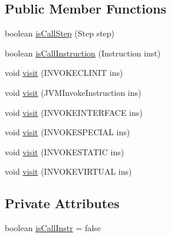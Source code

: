 \subsection*{Public Member Functions}
\begin{DoxyCompactItemize}
\item 
boolean \hyperlink{classgov_1_1nasa_1_1jpf_1_1inspector_1_1server_1_1pathanalysis_1_1_check_call_instruction_ad86391aaa5ef56fbf68af4fad31fcc7b}{is\+Call\+Step} (Step step)
\item 
boolean \hyperlink{classgov_1_1nasa_1_1jpf_1_1inspector_1_1server_1_1pathanalysis_1_1_check_call_instruction_aee2bf82b423eef6de81041c074340327}{is\+Call\+Instruction} (Instruction inst)
\item 
void \hyperlink{classgov_1_1nasa_1_1jpf_1_1inspector_1_1server_1_1pathanalysis_1_1_check_call_instruction_a9013497ed967aba3370f5b6ed14b155f}{visit} (I\+N\+V\+O\+K\+E\+C\+L\+I\+N\+IT ins)
\item 
void \hyperlink{classgov_1_1nasa_1_1jpf_1_1inspector_1_1server_1_1pathanalysis_1_1_check_call_instruction_af7eda93c3473fe1050332f3266f754f7}{visit} (J\+V\+M\+Invoke\+Instruction ins)
\item 
void \hyperlink{classgov_1_1nasa_1_1jpf_1_1inspector_1_1server_1_1pathanalysis_1_1_check_call_instruction_a8ee0595afd706bb2caa5452f3c4eeca9}{visit} (I\+N\+V\+O\+K\+E\+I\+N\+T\+E\+R\+F\+A\+CE ins)
\item 
void \hyperlink{classgov_1_1nasa_1_1jpf_1_1inspector_1_1server_1_1pathanalysis_1_1_check_call_instruction_ae4ee05f2e6617ddefbb088381c9125d7}{visit} (I\+N\+V\+O\+K\+E\+S\+P\+E\+C\+I\+AL ins)
\item 
void \hyperlink{classgov_1_1nasa_1_1jpf_1_1inspector_1_1server_1_1pathanalysis_1_1_check_call_instruction_a0c068d97695d2e16705cab2298caa442}{visit} (I\+N\+V\+O\+K\+E\+S\+T\+A\+T\+IC ins)
\item 
void \hyperlink{classgov_1_1nasa_1_1jpf_1_1inspector_1_1server_1_1pathanalysis_1_1_check_call_instruction_af5b10565e28fafc22a5d80b50621e780}{visit} (I\+N\+V\+O\+K\+E\+V\+I\+R\+T\+U\+AL ins)
\end{DoxyCompactItemize}
\subsection*{Private Attributes}
\begin{DoxyCompactItemize}
\item 
boolean \hyperlink{classgov_1_1nasa_1_1jpf_1_1inspector_1_1server_1_1pathanalysis_1_1_check_call_instruction_a925aecab303dc7fbf7a0011c10787764}{is\+Call\+Instr} = false
\end{DoxyCompactItemize}


